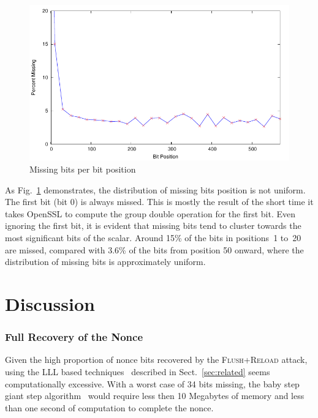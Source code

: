 \documentclass[twocolumn]{svjour3}
\newcommand{\fl}{\textsc{Flu\-sh+\allowbreak Re\-load}\xspace}
\begin{document}
\begin{figure}[htb]
\includegraphics[width=\columnwidth]{positions}
\caption{Missing bits per bit position\label{dgm:missed}}
\end{figure}

As Fig.~\ref{dgm:missed} demonstrates, the distribution of missing bits position is not uniform.
The first bit (bit 0) is always missed.
This is mostly the result of the short time it takes OpenSSL to compute the group double operation for the first bit.
Even ignoring the first bit, it is evident that missing bits tend to cluster towards the most significant bits of the
scalar.
Around 15\% of the bits in positions~1 to~20 are missed, compared with 3.6\% of the bits from position 50 onward,
where the distribution of missing bits is approximately uniform.





\section{Discussion}\label{sec:discussion}

\subsubsection*{Full Recovery of the Nonce}\label{sub:full_nonce}
Given the high proportion of nonce bits recovered by the \fl attack, using the LLL based techniques~\cite{Howgrave-GrahamS01,nguyen03insecurity} described in Sect.~\ref{sec:related} seems computationally excessive. 
With a worst case of 34 bits missing, the baby step giant step algorithm~\cite{shanks71class} would require less then 10 Megabytes of memory and less than one second of computation to complete the nonce.
\end{document}
